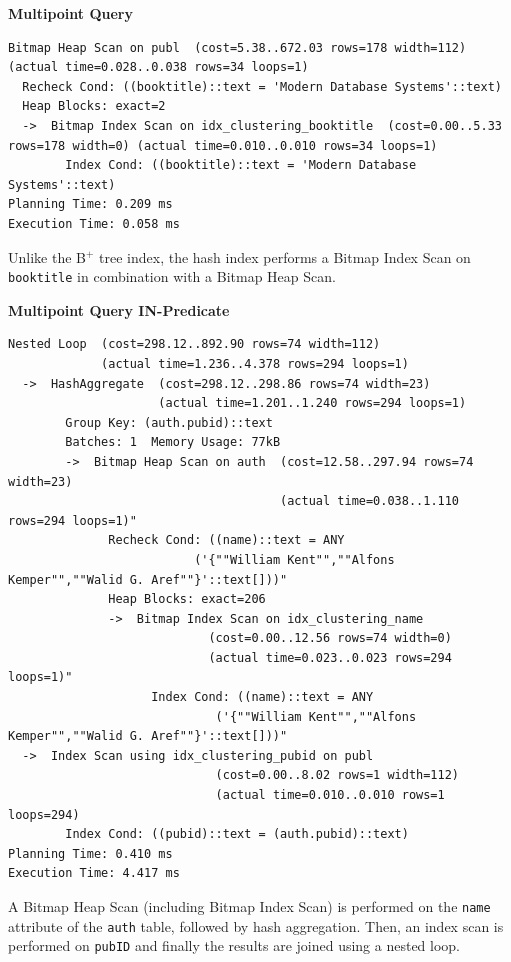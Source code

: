 \documentclass[11pt]{scrartcl}
\begin{document}
\textbf{Multipoint Query}
{\small
\parskip0pt\begin{verbatim}
Bitmap Heap Scan on publ  (cost=5.38..672.03 rows=178 width=112) (actual time=0.028..0.038 rows=34 loops=1)
  Recheck Cond: ((booktitle)::text = 'Modern Database Systems'::text)
  Heap Blocks: exact=2
  ->  Bitmap Index Scan on idx_clustering_booktitle  (cost=0.00..5.33 rows=178 width=0) (actual time=0.010..0.010 rows=34 loops=1)
        Index Cond: ((booktitle)::text = 'Modern Database Systems'::text)
Planning Time: 0.209 ms
Execution Time: 0.058 ms
\end{verbatim}}

Unlike the B$^+$ tree index, the hash index performs a Bitmap Index Scan on \texttt{booktitle} in combination with a Bitmap Heap Scan.

\textbf{Multipoint Query IN-Predicate}
{\small
\parskip0pt\begin{verbatim}
Nested Loop  (cost=298.12..892.90 rows=74 width=112)
             (actual time=1.236..4.378 rows=294 loops=1)
  ->  HashAggregate  (cost=298.12..298.86 rows=74 width=23)
                     (actual time=1.201..1.240 rows=294 loops=1)
        Group Key: (auth.pubid)::text
        Batches: 1  Memory Usage: 77kB
        ->  Bitmap Heap Scan on auth  (cost=12.58..297.94 rows=74 width=23)
                                      (actual time=0.038..1.110 rows=294 loops=1)"
              Recheck Cond: ((name)::text = ANY
                          ('{""William Kent"",""Alfons Kemper"",""Walid G. Aref""}'::text[]))"
              Heap Blocks: exact=206
              ->  Bitmap Index Scan on idx_clustering_name
                            (cost=0.00..12.56 rows=74 width=0)
                            (actual time=0.023..0.023 rows=294 loops=1)"
                    Index Cond: ((name)::text = ANY
                             ('{""William Kent"",""Alfons Kemper"",""Walid G. Aref""}'::text[]))"
  ->  Index Scan using idx_clustering_pubid on publ
                             (cost=0.00..8.02 rows=1 width=112)
                             (actual time=0.010..0.010 rows=1 loops=294)
        Index Cond: ((pubid)::text = (auth.pubid)::text)
Planning Time: 0.410 ms
Execution Time: 4.417 ms
\end{verbatim}}

A Bitmap Heap Scan (including Bitmap Index Scan) is performed on the \texttt{name} attribute of the \texttt{auth} table, followed by hash aggregation.
Then, an index scan is performed on \texttt{pubID} and finally the results are joined using a nested loop.
\end{document}

